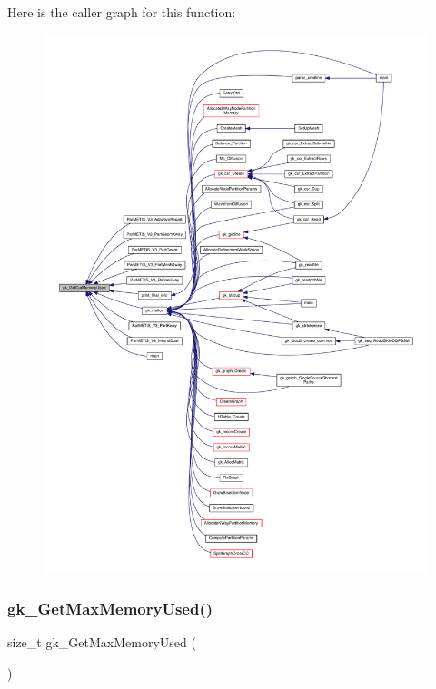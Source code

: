 Here is the caller graph for this function\+:\nopagebreak
\begin{figure}[H]
\begin{center}
\leavevmode
\includegraphics[width=350pt]{a00110_ad2327b94227019b6753b6b09400c0522_icgraph}
\end{center}
\end{figure}
\mbox{\label{a00110_a656fd5266ae12a96e53125486f8fea52}} 
\subsubsection{\texorpdfstring{gk\+\_\+\+Get\+Max\+Memory\+Used()}{gk\_GetMaxMemoryUsed()}}
{\footnotesize\ttfamily size\+\_\+t gk\+\_\+\+Get\+Max\+Memory\+Used (\begin{DoxyParamCaption}{ }\end{DoxyParamCaption})}

